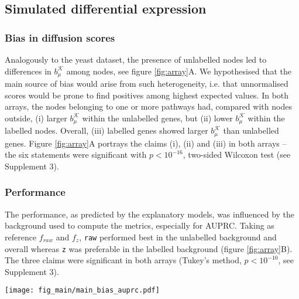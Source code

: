 \documentclass[final]{bioinfo}
\newcommand{\method}{\texttt}
\newcommand{\ebias}{b_{\mu}^{\mathcal{K}}}
\begin{document}
\subsection*{Simulated differential expression}

\subsubsection*{Bias in diffusion scores}

Analogously to the yeast dataset, the presence of unlabelled nodes led to differences in $\ebias$ among nodes, see figure \ref{fig:array}A. 
We hypothesised that the main source of bias would arise from such heterogeneity, i.e. that unnormalised scores would be prone to find positives among highest expected values. 
In both arrays, the nodes belonging to one or more pathways had, compared with nodes outside, (i) larger $\ebias$ within the unlabelled genes, but (ii) lower $\ebias$ within the labelled nodes. 
Overall, (iii) labelled genes showed larger $\ebias$ than unlabelled genes.
Figure \ref{fig:array}A portrays the claims (i), (ii) and (iii) in both arrays -- the six statements were significant with $p<10^{-16}$, two-sided Wilcoxon test (see Supplement 3). 

\subsubsection*{Performance}

The performance, as predicted by the explanatory models, was influenced by the background used to compute the metrics, especially for AUPRC. 
Taking as reference $f_{raw}$ and $f_z$, \method{raw} performed best in the unlabelled background and overall whereas \method{z} was preferable in the labelled background (figure \ref{fig:array}B). 
The three claims were significant in both arrays (Tukey's method, $p<10^{-10}$, see Supplement 3).

\begin{figure*}[!tpb]%
\centerline{
\texttt{[image: fig\_main/main\_bias\_auprc.pdf]}
}
\caption{Performance in the DLBCL dataset. 
\textbf{(A)} Expected value-related bias. 
Within the labelled genes of both arrays, those in pathways had lower $\ebias$ that those outside. 
Within the unlabelled genes, this tendency was inverted. 
Overall, labelled genes had higher $\ebias$ than unlabelled genes. 
\textbf{(B)} Predicted AUPRC (0.95 confidence interval) using the explanatory model in Table \ref{tab:datasets} and Supplement 3. 
Besides diffusion scores, three baselines were included: \method{original} (ranking by the p-values), \method{pagerank} and \method{random}. 
In both arrays (\textit{ALL} and \textit{Lym}), \method{raw} outperformed \method{z} in unlabelled nodes and overall, while \method{z} was preferable in the labelled genes. 
}\label{fig:array}
\end{figure*}
\end{document}
